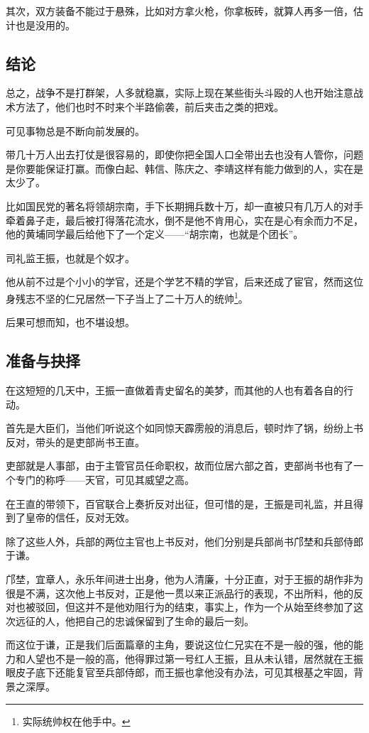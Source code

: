 \begin{multicols}{\theparacolNo}
其次，双方装备不能过于悬殊，比如对方拿火枪，你拿板砖，就算人再多一倍，估计也是没用的。

\subsection{结论}
总之，战争不是打群架，人多就稳赢，实际上现在某些街头斗殴的人也开始注意战术方法了，他们也时不时来个半路偷袭，前后夹击之类的把戏。

可见事物总是不断向前发展的。

带几十万人出去打仗是很容易的，即使你把全国人口全带出去也没有人管你，问题是你要能保证打赢。而像白起、韩信、陈庆之、李靖这样有能力做到的人，实在是太少了。

比如国民党的著名将领胡宗南，手下长期拥兵数十万，却一直被只有几万人的对手牵着鼻子走，最后被打得落花流水，倒不是他不肯用心，实在是心有余而力不足，他的黄埔同学最后给他下了一个定义——“胡宗南，也就是个团长”。

司礼监王振，也就是个奴才。

他从前不过是个小小的学官，还是个学艺不精的学官，后来还成了宦官，然而这位身残志不坚的仁兄居然一下子当上了二十万人的统帅\footnote{实际统帅权在他手中。}。

后果可想而知，也不堪设想。

\subsection{准备与抉择}
在这短短的几天中，王振一直做着青史留名的美梦，而其他的人也有着各自的行动。

首先是大臣们，当他们听说这个如同惊天霹雳般的消息后，顿时炸了锅，纷纷上书反对，带头的是吏部尚书王直。

吏部就是人事部，由于主管官员任命职权，故而位居六部之首，吏部尚书也有了一个专门的称呼——天官，可见其威望之高。

在王直的带领下，百官联合上奏折反对出征，但可惜的是，王振是司礼监，并且得到了皇帝的信任，反对无效。

除了这些人外，兵部的两位主官也上书反对，他们分别是兵部尚书邝埜和兵部侍郎于谦。

邝埜，宜章人，永乐年间进士出身，他为人清廉，十分正直，对于王振的胡作非为很是不满，这次他上书反对，正是他一贯以来正派品行的表现，不出所料，他的反对也被驳回，但这并不是他劝阻行为的结束，事实上，作为一个从始至终参加了这次远征的人，他把自己的忠诚保留到了生命的最后一刻。

而这位于谦，正是我们后面篇章的主角，要说这位仁兄实在不是一般的强，他的能力和人望也不是一般的高，他得罪过第一号红人王振，且从未认错，居然就在王振眼皮子底下还能复官至兵部侍郎，而王振也拿他没有办法，可见其根基之牢固，背景之深厚。


\end{multicols}

